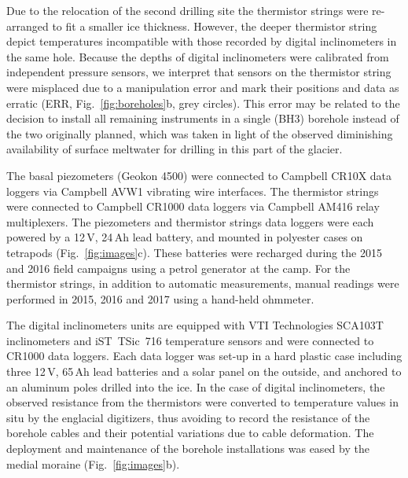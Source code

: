 \documentclass[utf8]{article}
\begin{document}
    Due to the relocation of the second drilling site the thermistor strings
    were re-arranged to fit a smaller ice thickness. However, the deeper
    thermistor string depict temperatures incompatible with those recorded by
    digital inclinometers in the same hole. Because the depths of digital
    inclinometers were calibrated from independent pressure sensors, we
    interpret that sensors on the thermistor string were misplaced due to a
    manipulation error and mark their positions and data as erratic (ERR,
    Fig.~\ref{fig:boreholes}b, grey circles). This error may be related to the
    decision to install all remaining instruments in a single (BH3) borehole
    instead of the two originally planned, which was taken in light of
    the observed diminishing availability of surface meltwater for drilling in
    this part of the glacier.

    The basal piezometers (Geokon 4500) were connected to Campbell CR10X data
    loggers via Campbell AVW1 vibrating wire interfaces. The thermistor strings
    \citep[NTC~Fenwal 135-103FAG-J01,][]{Ryser.2014} were connected to Campbell
    CR1000 data loggers via Campbell AM416 relay multiplexers. The piezometers
    and thermistor strings data loggers were each powered by a 12\,V, 24\,Ah
    lead battery, and mounted in polyester cases on tetrapods
    (Fig.~\ref{fig:images}c). These batteries were recharged during the 2015
    and 2016 field campaigns using
    a petrol generator at the camp. For the thermistor strings, in addition to
    automatic measurements, manual readings were performed in 2015, 2016 and
    2017 using a hand-held ohmmeter.

    The digital inclinometers units \citep[DIBOSS,][]{Ryser.2014,
    Ryser.etal.2014, Ryser.etal.2014a} are equipped with VTI Technologies
    SCA103T inclinometers and iST~TSic~716 temperature sensors and
    were connected to CR1000 data loggers. Each data logger
    was set-up in a hard plastic case including three 12\,V, 65\,Ah lead
    batteries and a solar panel on the outside, and anchored to an aluminum
    poles drilled into the ice.
    In the case of digital inclinometers, the observed resistance from the
    thermistors were converted to temperature values in situ by the englacial
    digitizers, thus avoiding to record the resistance of the borehole cables
    and their potential variations due to cable deformation. The deployment and
    maintenance of the borehole installations was eased by the medial moraine
    (Fig.~\ref{fig:images}b).
\end{document}
